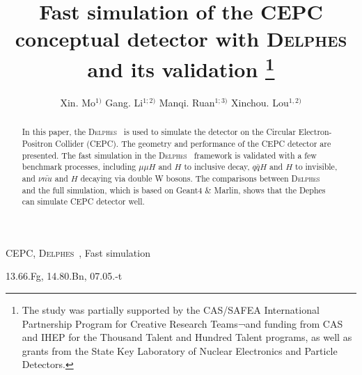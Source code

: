\documentclass[a4paper,10pt,twoside]{cpc-hepnp}
\begin{document}



\title{Fast simulation of the CEPC conceptual detector with  {\textsc{Delphes}} and its validation 
\thanks{The study was partially supported by the CAS/SAFEA International Partnership Program for Creative Research Teams¬and funding from CAS and IHEP for the Thousand Talent and Hundred Talent programs, as well as grants from the State Key Laboratory of Nuclear Electronics and Particle Detectors.}}

\author{%
      Xin. Mo$^{1)}$%
\quad Gang. Li$^{1;2)}$%
\quad Manqi. Ruan$^{1;3)}$%
\quad Xinchou. Lou$^{1,2)}$%
}
\maketitle


\address{%
$^1$ Institute of High Energy Physics, Chinese Academy of Sciences, Beijing 100049, China\\
$^2$ University of Texas at Dallas, Richardson, TX 75080-3021, USA
}


\begin{abstract}
In this paper, the {\textsc{Delphes}~} is used to simulate the detector on the Circular Electron-Positron Collider (CEPC). The geometry and performance of the CEPC detector are presented. The fast simulation in the {\textsc{Delphes}~} framework is validated with  a few benchmark processes, including $\mu\mu H$ and $H$ to inclusive decay,  $q\bar{q}H$ and $H$ to invisible, and $\nu\bar{nu}$ and $H$ decaying via double W bosons. The comparisons between {\textsc{Delphes}~} and the full simulation, which is based on Geant4 \& Marlin, shows that the Dephes can simulate CEPC detector well.  
\end{abstract}


\begin{keyword}
CEPC, {\textsc{Delphes}~}, Fast simulation
\end{keyword}

\begin{pacs}
13.66.Fg, 14.80.Bn, 07.05.-t
\end{pacs}

%
\end{document}
